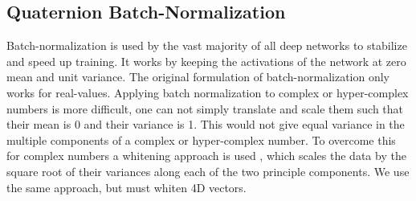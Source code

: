 \subsection{Quaternion Batch-Normalization}
Batch-normalization \cite{ioffe2015batch} is used by the vast majority of all deep networks to stabilize and speed up training.
It works by keeping the activations of the network at zero mean and unit variance.
The original formulation of batch-normalization only works for real-values. 
Applying batch normalization to complex or hyper-complex numbers is more difficult, one can not simply translate and scale them such that their mean is 0 and their variance is 1.
This would not give equal variance in the multiple components of a complex or hyper-complex number.
To overcome this for complex numbers a whitening approach is used \cite{trabelsi2017deep}, which scales the data by the square root of their variances along each of the two principle components.
We use the same approach, but must whiten 4D vectors.

